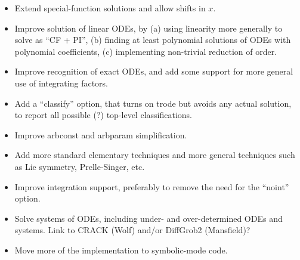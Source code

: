 \documentclass[a4paper]{article} %
\begin{document}
\begin{itemize}

\item
Extend special-function solutions and allow shifts in $x$.

\item
Improve solution of linear ODEs, by (a) using linearity more generally
to solve as ``CF + PI'', (b) finding at least polynomial solutions of
ODEs with polynomial coefficients, (c) implementing non-trivial
reduction of order.

\item
Improve recognition of exact ODEs, and add some support for more
general use of integrating factors.

\item
Add a ``classify'' option, that turns on trode but avoids any actual
solution, to report all possible (\@?) top-level classifications.

\item
Improve arbconst and arbparam simplification.

\item
Add more standard elementary techniques and more general techniques
such as Lie symmetry, Prelle-Singer, etc.

\item
Improve integration support, preferably to remove the need for the
``noint'' option.

\item
Solve systems of ODEs, including under- and over-determined ODEs and
systems.  Link to CRACK (Wolf) and/or DiffGrob2 (Mansfield)?

\item
Move more of the implementation to symbolic-mode code.

\end{itemize}
\end{document}
